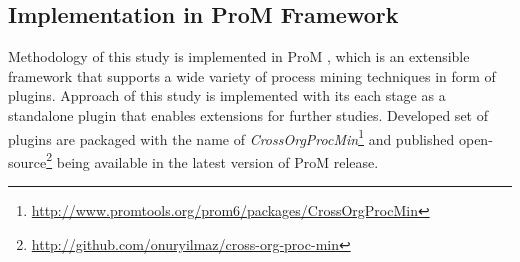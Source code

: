 \subsection{Implementation in ProM Framework}
\label{subsec:implementation}
Methodology of this study is implemented in ProM \cite{verbeek2010prom}, which is an extensible framework that supports a wide variety of process mining techniques in form of plugins. Approach of this study is implemented with its each stage as a standalone plugin that enables extensions for further studies. Developed set of plugins are packaged with the name of \textit{CrossOrgProcMin}\footnote{\url{http://www.promtools.org/prom6/packages/CrossOrgProcMin}} and published open-source\footnote{\url{http://github.com/onuryilmaz/cross-org-proc-min}} being available in the latest version of ProM release.